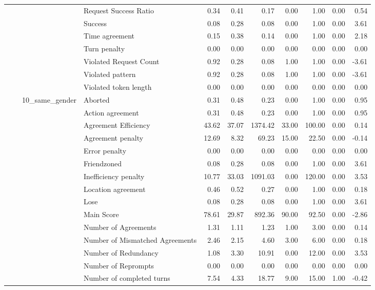 \begin{tabular}{llllrrrrrrr}
 &  &  & Request Success Ratio & 0.34 & 0.41 & 0.17 & 0.00 & 1.00 & 0.00 & 0.54 \\
 &  &  & Success & 0.08 & 0.28 & 0.08 & 0.00 & 1.00 & 0.00 & 3.61 \\
 &  &  & Time agreement & 0.15 & 0.38 & 0.14 & 0.00 & 1.00 & 0.00 & 2.18 \\
 &  &  & Turn penalty & 0.00 & 0.00 & 0.00 & 0.00 & 0.00 & 0.00 & 0.00 \\
 &  &  & Violated Request Count & 0.92 & 0.28 & 0.08 & 1.00 & 1.00 & 0.00 & -3.61 \\
 &  &  & Violated pattern & 0.92 & 0.28 & 0.08 & 1.00 & 1.00 & 0.00 & -3.61 \\
 &  &  & Violated token length & 0.00 & 0.00 & 0.00 & 0.00 & 0.00 & 0.00 & 0.00 \\
\cline{3-11}
 &  & \multirow[t]{27}{*}{10_same_gender} & Aborted & 0.31 & 0.48 & 0.23 & 0.00 & 1.00 & 0.00 & 0.95 \\
 &  &  & Action agreement & 0.31 & 0.48 & 0.23 & 0.00 & 1.00 & 0.00 & 0.95 \\
 &  &  & Agreement Efficiency & 43.62 & 37.07 & 1374.42 & 33.00 & 100.00 & 0.00 & 0.14 \\
 &  &  & Agreement penalty & 12.69 & 8.32 & 69.23 & 15.00 & 22.50 & 0.00 & -0.14 \\
 &  &  & Error penalty & 0.00 & 0.00 & 0.00 & 0.00 & 0.00 & 0.00 & 0.00 \\
 &  &  & Friendzoned & 0.08 & 0.28 & 0.08 & 0.00 & 1.00 & 0.00 & 3.61 \\
 &  &  & Inefficiency penalty & 10.77 & 33.03 & 1091.03 & 0.00 & 120.00 & 0.00 & 3.53 \\
 &  &  & Location agreement & 0.46 & 0.52 & 0.27 & 0.00 & 1.00 & 0.00 & 0.18 \\
 &  &  & Lose & 0.08 & 0.28 & 0.08 & 0.00 & 1.00 & 0.00 & 3.61 \\
 &  &  & Main Score & 78.61 & 29.87 & 892.36 & 90.00 & 92.50 & 0.00 & -2.86 \\
 &  &  & Number of Agreements & 1.31 & 1.11 & 1.23 & 1.00 & 3.00 & 0.00 & 0.14 \\
 &  &  & Number of Mismatched Agreements & 2.46 & 2.15 & 4.60 & 3.00 & 6.00 & 0.00 & 0.18 \\
 &  &  & Number of Redundancy & 1.08 & 3.30 & 10.91 & 0.00 & 12.00 & 0.00 & 3.53 \\
 &  &  & Number of Reprompts & 0.00 & 0.00 & 0.00 & 0.00 & 0.00 & 0.00 & 0.00 \\
 &  &  & Number of completed turns & 7.54 & 4.33 & 18.77 & 9.00 & 15.00 & 1.00 & -0.42 \\

\end{tabular}
